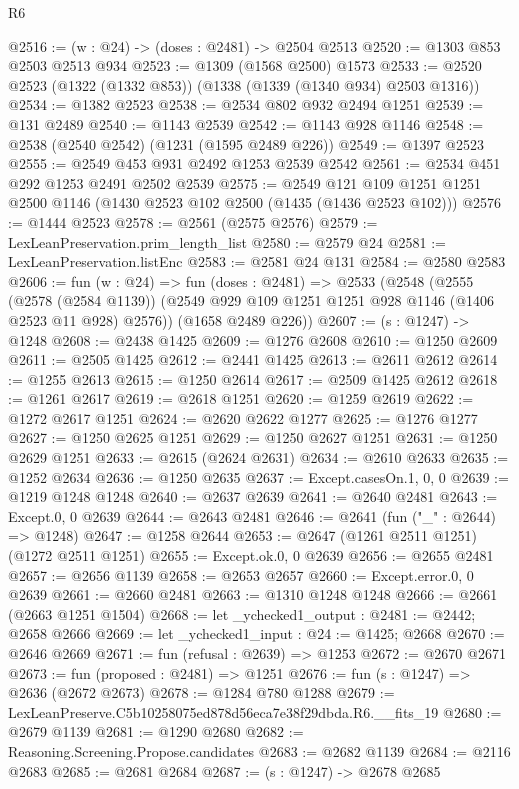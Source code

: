 \begin{lexlean}{R6}
\begin{coremodule}
@2516 := (w : @24) -> (doses : @2481) -> @2504 @2513
@2520 := @1303 @853 @2503 @2513 @934
@2523 := @1309 (@1568 @2500) @1573
@2533 := @2520 @2523 (@1322 (@1332 @853)) (@1338 (@1339 (@1340 @934) @2503 @1316))
@2534 := @1382 @2523
@2538 := @2534 @802 @932 @2494 @1251
@2539 := @131 @2489
@2540 := @1143 @2539
@2542 := @1143 @928 @1146
@2548 := @2538 (@2540 @2542) (@1231 (@1595 @2489 @226))
@2549 := @1397 @2523
@2555 := @2549 @453 @931 @2492 @1253 @2539 @2542
@2561 := @2534 @451 @292 @1253 @2491 @2502 @2539
@2575 := @2549 @121 @109 @1251 @1251 @2500 @1146 (@1430 @2523 @102 @2500 (@1435 (@1436 @2523 @102)))
@2576 := @1444 @2523
@2578 := @2561 (@2575 @2576)
@2579 := LexLeanPreservation.prim_length_list
@2580 := @2579 @24
@2581 := LexLeanPreservation.listEnc
@2583 := @2581 @24 @131
@2584 := @2580 @2583
@2606 := fun (w : @24) =>
  fun (doses : @2481) =>
  @2533
    (@2548
      (@2555
        (@2578 (@2584 @1139))
        (@2549 @929 @109 @1251 @1251 @928 @1146 (@1406 @2523 @11 @928) @2576))
      (@1658 @2489 @226))
@2607 := (s : @1247) -> @1248
@2608 := @2438 @1425
@2609 := @1276 @2608
@2610 := @1250 @2609
@2611 := @2505 @1425
@2612 := @2441 @1425
@2613 := @2611 @2612
@2614 := @1255 @2613
@2615 := @1250 @2614
@2617 := @2509 @1425 @2612
@2618 := @1261 @2617
@2619 := @2618 @1251
@2620 := @1259 @2619
@2622 := @1272 @2617 @1251
@2624 := @2620 @2622 @1277
@2625 := @1276 @1277
@2627 := @1250 @2625 @1251
@2629 := @1250 @2627 @1251
@2631 := @1250 @2629 @1251
@2633 := @2615 (@2624 @2631)
@2634 := @2610 @2633
@2635 := @1252 @2634
@2636 := @1250 @2635
@2637 := Except.casesOn.{1, 0, 0}
@2639 := @1219 @1248 @1248
@2640 := @2637 @2639
@2641 := @2640 @2481
@2643 := Except.{0, 0} @2639
@2644 := @2643 @2481
@2646 := @2641 (fun ("_" : @2644) => @1248)
@2647 := @1258 @2644
@2653 := @2647 (@1261 @2511 @1251) (@1272 @2511 @1251)
@2655 := Except.ok.{0, 0} @2639
@2656 := @2655 @2481
@2657 := @2656 @1139
@2658 := @2653 @2657
@2660 := Except.error.{0, 0} @2639
@2661 := @2660 @2481
@2663 := @1310 @1248 @1248
@2666 := @2661 (@2663 @1251 @1504)
@2668 := let _ychecked1_output : @2481 := @2442; @2658 @2666
@2669 := let _ychecked1_input : @24 := @1425; @2668
@2670 := @2646 @2669
@2671 := fun (refusal : @2639) => @1253
@2672 := @2670 @2671
@2673 := fun (proposed : @2481) => @1251
@2676 := fun (s : @1247) => @2636 (@2672 @2673)
@2678 := @1284 @780 @1288
@2679 := LexLeanPreserve.C5b10258075ed878d56eca7e38f29dbda.R6.__fits_19
@2680 := @2679 @1139
@2681 := @1290 @2680
@2682 := Reasoning.Screening.Propose.candidates
@2683 := @2682 @1139
@2684 := @2116 @2683
@2685 := @2681 @2684
@2687 := (s : @1247) -> @2678 @2685

\end{coremodule}
\end{lexlean}
